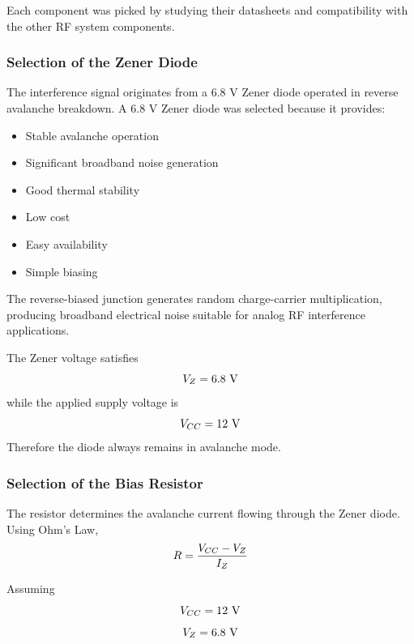 \documentclass[12pt,a4paper]{report}
\begin{document}
	Each component was picked by studying their datasheets and compatibility with the other RF system components.
		
	\subsubsection{Selection of the Zener Diode}
	
	The interference signal originates from a 6.8 V Zener diode operated in reverse avalanche breakdown. A 6.8 V Zener diode was selected because it provides:
	\begin{itemize}
		\item Stable avalanche operation
		\item Significant broadband noise generation
		\item Good thermal stability
		\item Low cost
		\item Easy availability
		\item Simple biasing
	\end{itemize}
	The reverse-biased junction generates random charge-carrier multiplication, producing broadband electrical noise suitable for analog RF interference applications.
	
	The Zener voltage satisfies
	\begingroup
	\setlength{\mathindent}{0pt}
	\begin{equation*}
		\hfill
		V_Z = 6.8\ \text{V}
		\hfill
	\end{equation*}
	\endgroup
	while the applied supply voltage is
	\begingroup
	\setlength{\mathindent}{0pt}
	\begin{equation*}
		\hfill
		V_{CC} = 12\ \text{V}
		\hfill
	\end{equation*}
	\endgroup
	Therefore the diode always remains in avalanche mode.
	
	\subsubsection{Selection of the Bias Resistor}
	
	The resistor determines the avalanche current flowing through the Zener diode. Using Ohm's Law,
	\begingroup
	\setlength{\mathindent}{0pt}
	\begin{equation*}
		\hfill
		R = \frac{V_{CC} - V_Z}{I_Z}
		\hfill
	\end{equation*}
	\endgroup
	
	Assuming
	\begingroup
	\setlength{\mathindent}{0pt}
	\begin{equation*}
		\hfill
		V_{CC} = 12\ \text{V}
		\hfill
	\end{equation*}
	\endgroup
	\begingroup
	\setlength{\mathindent}{0pt}
	\begin{equation*}
		\hfill
		V_Z = 6.8\ \text{V}
		\hfill
	\end{equation*}
	\endgroup
	
\end{document}
